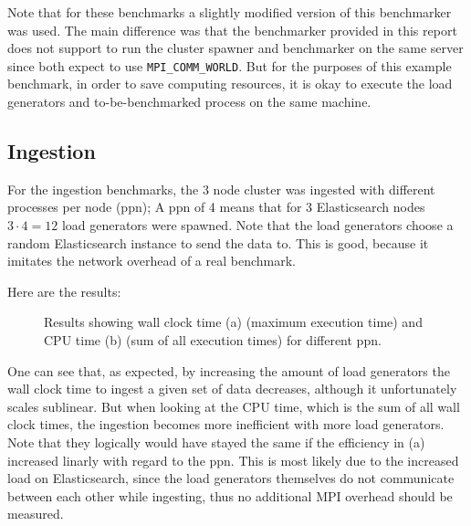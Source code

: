 Note that for these benchmarks a slightly modified version of this benchmarker was used. The main difference was that the benchmarker provided in this report does not support to run the cluster spawner and benchmarker on the same server since both expect to use \texttt{MPI\_COMM\_WORLD}. But for the purposes of this example benchmark, in order to save computing resources, it is okay to execute the load generators and to-be-benchmarked process on the same machine.

\subsection{Ingestion}
For the ingestion benchmarks, the 3 node cluster was ingested with different processes per node (ppn); A ppn of 4 means that for 3 Elasticsearch nodes $3 \cdot 4 = 12$ load generators were spawned. Note that the load generators choose a random Elasticsearch instance to send the data to. This is good, because it imitates the network overhead of a real benchmark.

Here are the results:
\begin{figure}[H]%
    \centering
    \qquad
    \caption{Results showing wall clock time (a) (maximum execution time) and CPU time (b) (sum of all execution times) for different ppn.}%
\end{figure}

One can see that, as expected, by increasing the amount of load generators the wall clock time to ingest a given set of data decreases, although it unfortunately scales sublinear. But when looking at the CPU time, which is the sum of all wall clock times, the ingestion becomes more inefficient with more load generators. Note that they logically would have stayed the same if the efficiency in (a) increased linarly with regard to the ppn. This is most likely due to the increased load on Elasticsearch, since the load generators themselves do not communicate between each other while ingesting, thus no additional MPI overhead should be measured.

